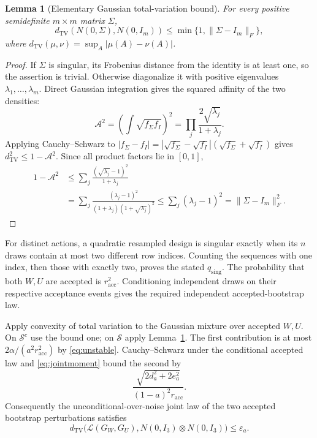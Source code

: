 \documentclass[11pt]{article}
\newtheorem{lemma}{Lemma}
\newcommand{\TV}{d_{\mathrm{TV}}}
\begin{document}
\begin{lemma}[Elementary Gaussian total-variation bound]\label{lem:tv}
For every positive semidefinite $m\times m$ matrix $\Sigma$,
\[
 \TV(N(0,\Sigma),N(0,I_m))\le\min\{1,\|\Sigma-I_m\|_F\},
\]
where $\TV(\mu,\nu)=\sup_A|\mu(A)-\nu(A)|$.
\end{lemma}
\begin{proof}
If $\Sigma$ is singular, its Frobenius distance from the identity is at
least one, so the assertion is trivial. Otherwise diagonalize it with
positive eigenvalues $\lambda_1,\ldots,\lambda_m$. Direct Gaussian integration
gives the squared affinity of the two densities:
\[
 \mathcal A^2=\left(\int\sqrt{f_\Sigma f_I}\right)^2
          =\prod_j\frac{2\sqrt{\lambda_j}}{1+\lambda_j}.
\]
Applying Cauchy--Schwarz to
$|f_\Sigma-f_I|=|\sqrt{f_\Sigma}-\sqrt{f_I}|
(\sqrt{f_\Sigma}+\sqrt{f_I})$ gives
$\TV^2\le1-\mathcal A^2$. Since all product factors lie in $[0,1]$,
\begin{align*}
 1-\mathcal A^2
 &\le\sum_j\frac{(\sqrt{\lambda_j}-1)^2}{1+\lambda_j}\\
 &=\sum_j\frac{(\lambda_j-1)^2}
                  {(1+\lambda_j)(1+\sqrt{\lambda_j})^2}
 \le\sum_j(\lambda_j-1)^2=\|\Sigma-I_m\|_F^2.
\end{align*}
\end{proof}

For distinct actions, a quadratic resampled design is singular exactly when
its $n$ draws contain at most two different row indices. Counting the
sequences with one index, then those with exactly two, proves the stated
$q_{\mathrm{sing}}$. The probability that both $W,U$ are accepted is
$r_{\mathrm{acc}}^2$. Conditioning independent draws on their respective
acceptance events gives the required independent accepted-bootstrap law.

Apply convexity of total variation to the Gaussian mixture over accepted
$W,U$. On $\mathcal S^c$ use the bound one; on $\mathcal S$ apply
Lemma~\ref{lem:tv}. The first contribution is at most
$2\alpha/(a^2r_{\mathrm{acc}}^2)$ by \eqref{eq:unstable}. Cauchy--Schwarz
under the conditional accepted law and \eqref{eq:jointmoment} bound the
second by
\[
 \frac{\sqrt{2d_a^2+2e_a^2}}{(1-a)^2r_{\mathrm{acc}}}.
\]
Consequently the unconditional-over-noise joint law of the two accepted
bootstrap perturbations satisfies
\begin{equation}\label{eq:mixturetv}
 \TV\bigl(\mathcal L(G_W,G_U),N(0,I_3)\otimes N(0,I_3)\bigr)
       \le\varepsilon_a.
\end{equation}
\end{document}
